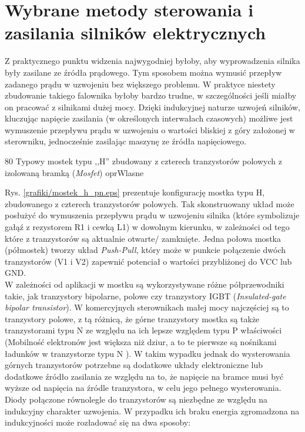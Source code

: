 \section{Wybrane metody sterowania i zasilania silników elektrycznych}

Z praktycznego punktu widzenia najwygodniej byłoby, aby wyprowadzenia silnika były zasilane ze źródła prądowego. Tym sposobem można wymusić przepływ zadanego prądu w uzwojeniu bez większego problemu. W praktyce niestety zbudowanie takiego falownika byłoby bardzo trudne, w szczególności jeśli miałby on pracować z silnikami dużej mocy. Dzięki indukcyjnej naturze uzwojeń silników, kluczując napięcie zasilania (w określonych interwałach czasowych) możliwe jest wymuszenie przepływu prądu w uzwojeniu o wartości bliskiej z góry założonej w sterowniku, jednocześnie zasilając maszynę ze źródła napięciowego.

	{80}
	{Typowy mostek typu ,,H'' zbudowany z czterech tranzystorów polowych z izolowaną bramką ({\it Mosfet})}
	{oprWlasne}

Rys. \ref{grafiki/mostek_h_pn.eps} prezentuje konfigurację mostka typu H, zbudowanego z czterech tranzystorów polowych. Tak skonstruowany układ może posłużyć do wymuszenia przepływu prądu w uzwojeniu silnika (które symbolizuje gałąź z rezystorem R1 i cewką L1) w dowolnym kierunku, w zależności od tego które z tranzystorów są aktualnie otwarte/ zamknięte. Jedna połowa mostka (półmostek) tworzy układ {\it Push-Pull}, który może w punkcie połączenie dwóch tranzystorów (V1 i V2) zapewnić potenciał o wartości przybliżonej do VCC lub GND. \\

W zależności od aplikacji w mostku są wykorzystywane różne półprzewodniki takie, jak tranzystory bipolarne, polowe czy tranzystory IGBT ({\it Insulated-gate bipolar transistor}). W komercyjnych sterownikach małej mocy najczęściej są to tranzystory polowe, z tą różnicą, że górne tranzystory mostka są także tranzystorami typu N ze względu na ich lepsze względem typu P właściwości (Mobilność elektronów jest większa niż dziur, a to te pierwsze są nośnikami ładunków w tranzystorze typu N \cite{tietze}). W takim wypadku jednak do wysterowania górnych tranzystorów potrzebne są dodatkowe układy elektroniczne lub dodatkowe źródło zasilania ze względu na to, że napięcie na bramce musi być wyższe od napięcia na źródle tranzystora, w celu jego pełnego wysterowania. \\

Diody połączone równolegle do tranzystorów są niezbędne ze względu na indukcyjny charakter uzwojenia. W przypadku ich braku energia zgromadzona na indukcyjności może rozładować się na dwa sposoby: 

